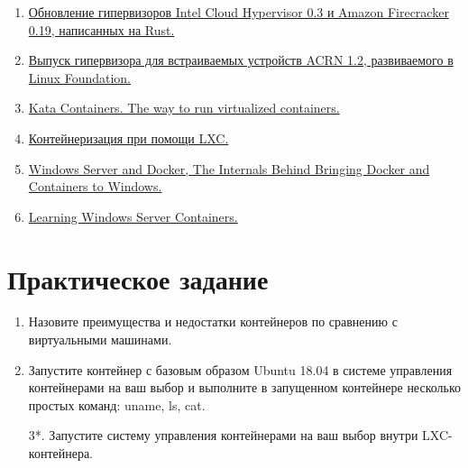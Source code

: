 \documentclass[14pt, a4paper]{article}
\begin{document}
\begin{enumerate}
    \item \href{https://www.opennet.ru/opennews/art.shtml?num=51759}{Обновление гипервизоров Intel Cloud Hypervisor 0.3 и Amazon Firecracker 0.19, написанных на
    Rust.}
    \item \href{https://www.opennet.ru/opennews/art.shtml?num=51399}{Выпуск гипервизора для встраиваемых устройств ACRN 1.2, развиваемого в Linux Foundation.}
    \item \href{https://object-storage-ca-ymq-1.vexxhost.net/swift/v1/6e4619c416ff4bd19e1c087f27a43eea/www-assets-prod/presentation-media/Kata-Containers-The-way-to-run-virtualized-containers.pdf}{Kata Containers. The way to run virtualized containers.}
    \item \href{http://onreader.mdl.ru/ContainerizationWithLXC/content/index.html%20https://www.packtpub.com/virtualization-and-cloud/containerization-lxc}{Контейнеризация при помощи LXC.}
    \item \href{https://www.slideshare.net/Docker/windows-server-and-docker-the-internals-behind-bringing-docker-and-containers-to-windows-by-taylor-brown-and-john-starks}{Windows Server and Docker, The Internals Behind Bringing Docker and Containers to Windows.}
    \item \href{https://www.packtpub.com/virtualization-and-cloud/learning-windows-server-containers}{Learning Windows Server Containers.}\\
\end{enumerate}

\section*{Практическое задание}

\begin{enumerate}
    \item Назовите преимущества и недостатки контейнеров по сравнению с виртуальными машинами.
    \item Запустите контейнер с базовым образом Ubuntu 18.04 в системе управления контейнерами на
    ваш выбор и выполните в запущенном контейнере несколько простых команд: uname, ls, cat.
    \item[3*.] Запустите систему управления контейнерами на ваш выбор внутри LXC-контейнера.
\end{enumerate}
\end{document}
